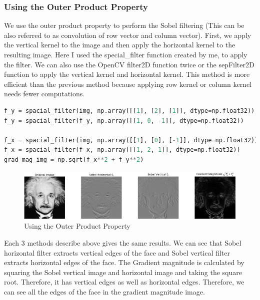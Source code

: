 \documentclass[a4paper]{article}
\begin{document}
\subsubsection*{Using the Outer Product Property}
We use the outer product property to perform the Sobel filtering
 (This can be also referred to as convolution of row vector and
  column vector). First, we apply the vertical kernel to the
   image and then apply the horizontal kernel to the resulting
    image. Here I used the special\_filter function created
     by me, to apply the filter. We can also use the OpenCV
      filter2D function twice or the sepFilter2D function to
       apply the vertical kernel and horizontal kernel. This
        method is more efficient than the previous method
         because applying row kernel or column kernel needs 
         fewer computations.
\begin{lstlisting}[language=python]
f_y = spacial_filter(img, np.array([[1], [2], [1]], dtype=np.float32))
f_y = spacial_filter(f_y, np.array([[1, 0, -1]], dtype=np.float32))

f_x = spacial_filter(img, np.array([[1], [0], [-1]], dtype=np.float32))
f_x = spacial_filter(f_x, np.array([[1, 2, 1]], dtype=np.float32))
grad_mag_img = np.sqrt(f_x**2 + f_y**2)
\end{lstlisting}
\begin{figure}[!htb]
    \centering
    \includegraphics[width=\textwidth]{../q63.png}
    \caption{Using the Outer Product Property}
    \label{figq63}
\end{figure}
Each 3 methods describe above gives the same results. We
 can see that Sobel horizontal filter extracts vertical edges
  of the face and Sobel vertical filter extracts horizontal
   edges of the face. The Gradient magnitude is calculated by
    squaring the Sobel vertical image and horizontal image and
     taking the square root. Therefore, it has vertical edges as
      well as horizontal edges. Therefore, we can see all the
       edges of the face in the gradient magnitude image.
\end{document}
